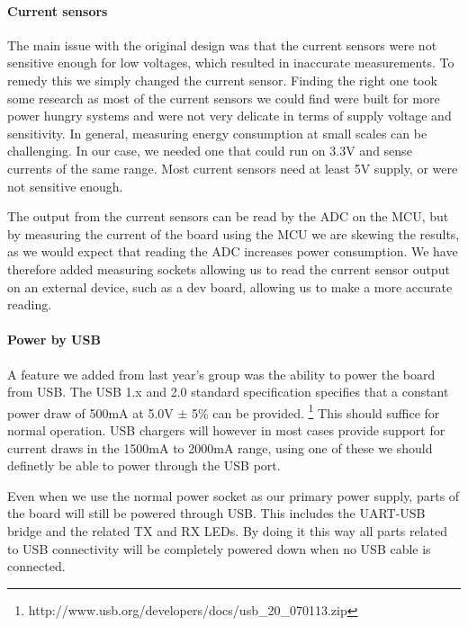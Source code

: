 \paragraph{Current sensors} \label{psu:current_sensors}
The main issue with the original design was that the current sensors were not
sensitive enough for low voltages, which resulted in inaccurate measurements. To
remedy this we simply changed the current sensor. Finding the right one took
some research as most of the current sensors we could find were built for more
power hungry systems and were not very delicate in terms of supply voltage and
sensitivity. In general, measuring energy consumption at small scales
 can be challenging.
In our case, we needed one that could run on 3.3V and
sense currents of the same range. Most current sensors need at least 5V supply,
or were not sensitive enough.

The output from the current sensors can be read by the ADC on the MCU, but by
measuring the current of the board using the MCU we are skewing the results, as
we would expect that reading the ADC increases power consumption. We have
therefore added measuring sockets allowing us to read the current sensor output
on an external device, such as a dev board, allowing us to make a more accurate
reading.

\paragraph{Power by USB} \label{psu:usb}
A feature we added from last year's group was the ability to power the board
from USB. The USB 1.x and 2.0 standard specification specifies that a constant
power draw of 500mA at 5.0V $\pm$ 5\% can be provided.
\footnote{http://www.usb.org/developers/docs/usb\_20\_070113.zip}
This should suffice for normal operation.
USB chargers will however in most cases provide support for current draws in
the 1500mA to 2000mA range, using one of these we should definetly be able to
power through the USB port.

Even when we use the normal power socket as our primary power supply, parts
of the board will still be powered through USB. This includes the UART-USB
bridge and the related TX and RX LEDs. By doing it this way all parts related
to USB connectivity will be completely powered down when no USB cable is
connected.